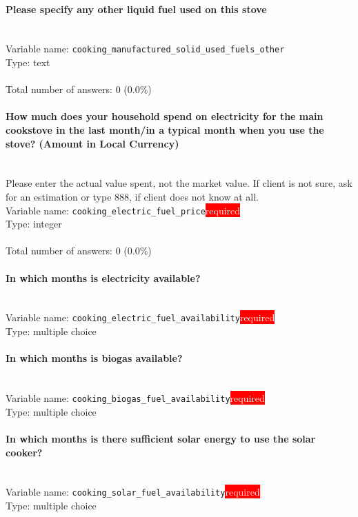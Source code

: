 \documentclass[11.5pt, a4paper]{scrartcl}
\begin{document}
\paragraph{Please specify any other liquid fuel used on this stove}
\  \\Variable name: \texttt{cooking\_manufactured\_solid\_used\_fuels\_other}\\
Type: text\\
\\Total number of answers: 0 (0.0\%)
\\[0.2em]\paragraph{How much does your household spend on electricity for the main cookstove in the last month/in a typical month when you use the stove? (Amount in Local Currency) }
\ \\ {\small Please enter the actual value spent, not the market value. If client is not sure, ask for an estimation or type 888, if client does not know at all. }
\  \\Variable name: \texttt{cooking\_electric\_fuel\_price}\hfill\colorbox{red}{\small{\textcolor{white}{required}}}\\
 Type: integer\\
\\Total number of answers: 0 (0.0\%)
\\[0.2em]\paragraph{In which months is electricity available?}
\  \\Variable name: \texttt{cooking\_electric\_fuel\_availability}\hfill\colorbox{red}{\small{\textcolor{white}{required}}}\\
 Type: multiple choice\\
\paragraph{In which months is biogas available?}
\  \\Variable name: \texttt{cooking\_biogas\_fuel\_availability}\hfill\colorbox{red}{\small{\textcolor{white}{required}}}\\
 Type: multiple choice\\
\paragraph{In which months is there sufficient solar energy to use the solar cooker?}
\  \\Variable name: \texttt{cooking\_solar\_fuel\_availability}\hfill\colorbox{red}{\small{\textcolor{white}{required}}}\\
 Type: multiple choice\\
\end{document}

